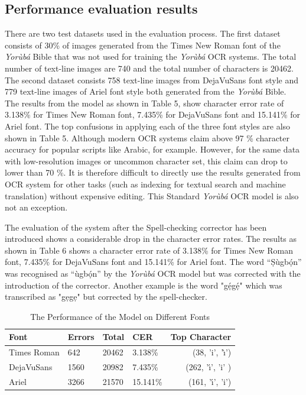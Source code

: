\documentclass[review]{elsarticle}
\newcommand{\q}[1]{``#1''}
\newcommand{\yor}{\textit{Yor\`ub\'a }}
\begin{document}
\subsection{Performance evaluation results}
There are two test datasets used in the evaluation process. The first dataset consists of 30\% of images generated from the Times New Roman font of the \yor Bible that was not used for training the \yor OCR systems. The total number of text-line images are 740 and the total number of characters is 20462. The second dataset consists 758 text-line images from DejaVuSans font style and 779 text-line images of Ariel font style both generated from the \yor Bible. The results from the model as shown in Table 5, show character error rate of 3.138\% for Times New Roman font, 7.435\% for DejaVuSans font and 15.141\% for Ariel font. The top confusions in applying each of the three font styles are also shown in Table 5. Although modern OCR systems claim above 97 \% character accuracy for popular scripts like Arabic, for example. However, for the same data with low-resolution images or uncommon character set, this claim can drop to lower than 70 \%. It is therefore difficult to directly use the results generated from OCR system for other tasks (such as indexing for textual search and machine translation) without expensive editing.  This Standard \yor OCR model is also not an exception. 

The evaluation of the system after the Spell-checking corrector has been introduced shows a considerable drop in the character error rates. The results as shown in Table 6 shows a character error rate of 3.138\% for Times New Roman font, 7.435\% for DejaVuSans font and 15.141\% for Ariel font. The word \q{\d{S}\`{u}gb\d{\'{o}}n} was recognised as \q{\`{u}gb\d{\'{o}}n} by the \yor OCR model but was corrected with the introduction of the corrector. Another example is the word "g\d{\'{e}}g\d{\'{e}}" which was transcribed as "g\d{e}g\d{e}" but corrected by the spell-checker.

\begin{table}
\centering
{\caption{The Performance of the Model on Different Fonts}\label{utterance structure} \smallskip}
\begin{tabular}{l p{2.5cm} p{2.0cm} p{2.0cm} r}\toprule[0.01cm]
	Font & Errors  & Total&CER&Top Character \bigstrut \\[2ex] \toprule[0.01cm]
	Times Roman & 642 & 20462 & 3.138\%  & (38, 'i', '\`{\i}')\bigstrut \\[2ex]
	DejaVuSans  & 1560 & 20982 & 7.435\%  & (262, '\'{\i}', 'i' )\bigstrut \\[2ex]
	Ariel       & 3266 & 21570 & 15.141\% & (161, '\'{\i}', 'i')\bigstrut \\[2ex]
	\hline
\end{tabular}
\end{table}
\end{document}
